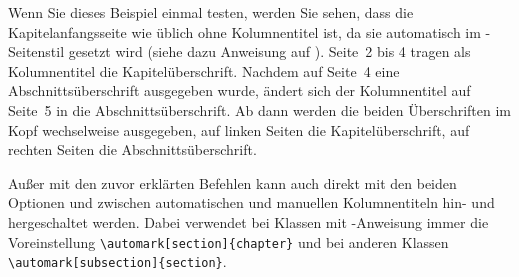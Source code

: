 \begin{Example}
      Wenn Sie dieses Beispiel einmal testen, werden Sie sehen, dass die
      Kapitelanfangsseite wie üblich ohne Kolumnentitel ist, da sie
      automatisch im -Seitenstil
       gesetzt wird (siehe
      dazu Anweisung  auf
      ). Seite~2 bis 4 tragen als
      Kolumnentitel die Kapitelüberschrift. Nachdem auf Seite~4 eine
      Abschnittsüberschrift ausgegeben wurde, ändert sich der Kolumnentitel
      auf Seite~5 in die Abschnittsüberschrift. Ab dann werden die beiden
      Überschriften im Kopf wechselweise ausgegeben, auf linken Seiten die
      Kapitelüberschrift, auf rechten Seiten die Abschnittsüberschrift.%
    \end{Example}
  \fi

  \begin{Declaration}
  \end{Declaration}
  Außer mit den zuvor erklärten Befehlen kann auch direkt mit den beiden
  Optionen
   und
   zwischen automatischen und manuellen Kolumnentiteln hin-
  und hergeschaltet werden. Dabei verwendet  bei Klassen mit
  -Anweisung immer die
  Voreinstellung
  \IfThisCommonLabelBase{scrlayer-scrpage}{\iftrue}{\csname
    iffalse\endcsname}%
    \lstinline|\automark[section]{chapter}| und bei anderen Klassen
    \lstinline|\automark[subsection]{section}|.
  \else
\begin{lstcode}
  \automark[section]{chapter}
\end{lstcode}
  und bei anderen Klassen:
\begin{lstcode}
  \automark[subsection]{section}
\end{lstcode}
  \fi

